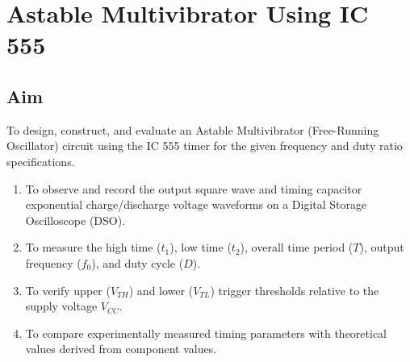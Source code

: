 
\chapter{Astable Multivibrator Using IC 555}

\section{Aim}
To design, construct, and evaluate an Astable Multivibrator (Free-Running Oscillator) circuit using the IC 555 timer for the given frequency and duty ratio specifications. %
\begin{enumerate}
	\item To observe and record the output square wave and timing capacitor exponential charge/discharge voltage waveforms on a Digital Storage Oscilloscope (DSO).
	\item To measure the high time ($t_1$), low time ($t_2$), overall time period ($T$), output frequency ($f_0$), and duty cycle ($D$).
	\item To verify upper ($V_{TH}$) and lower ($V_{TL}$) trigger thresholds relative to the supply voltage $V_{CC}$.
	\item To compare experimentally measured timing parameters with theoretical values derived from component values.
\end{enumerate}

